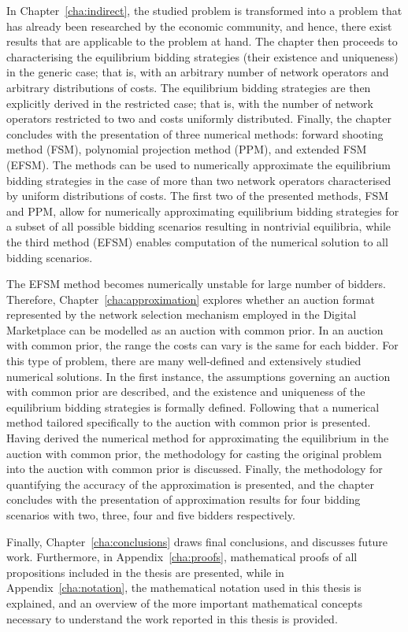 In Chapter~\ref{cha:indirect}, the studied problem is transformed into a problem that has already been researched by the economic community, and hence, there exist results that are applicable to the problem at hand. The chapter then proceeds to characterising the equilibrium bidding strategies (their existence and uniqueness) in the generic case; that is, with an arbitrary number of network operators and arbitrary distributions of costs. The equilibrium bidding strategies are then explicitly derived in the restricted case; that is, with the number of network operators restricted to two and costs uniformly distributed. Finally, the chapter concludes with the presentation of three numerical methods: forward shooting method (FSM), polynomial projection method (PPM), and extended FSM (EFSM). The methods can be used to numerically approximate the equilibrium bidding strategies in the case of more than two network operators characterised by uniform distributions of costs. The first two of the presented methods, FSM and PPM, allow for numerically approximating equilibrium bidding strategies for a subset of all possible bidding scenarios resulting in nontrivial equilibria, while the third method (EFSM) enables computation of the numerical solution to all bidding scenarios.

The EFSM method becomes numerically unstable for large number of bidders. Therefore, Chapter~\ref{cha:approximation} explores whether an auction format represented by the network selection mechanism employed in the Digital Marketplace can be modelled as an auction with common prior. In an auction with common prior, the range the costs can vary is the same for each bidder. For this type of problem, there are many well-defined and extensively studied numerical solutions. In the first instance, the assumptions governing an auction with common prior are described, and the existence and uniqueness of the equilibrium bidding strategies is formally defined. Following that a numerical method tailored specifically to the auction with common prior is presented. Having derived the numerical method for approximating the equilibrium in the auction with common prior, the methodology for casting the original problem into the auction with common prior is discussed. Finally, the methodology for quantifying the accuracy of the approximation is presented, and the chapter concludes with the presentation of approximation results for four bidding scenarios with two, three, four and five bidders respectively.

Finally, Chapter~\ref{cha:conclusions} draws final conclusions, and discusses future work. Furthermore, in Appendix~\ref{cha:proofs}, mathematical proofs of all propositions included in the thesis are presented, while in Appendix~\ref{cha:notation}, the mathematical notation used in this thesis is explained, and an overview of the more important mathematical concepts necessary to understand the work reported in this thesis is provided.

